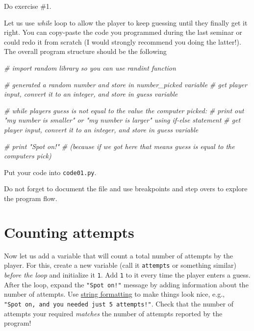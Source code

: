 \documentclass[
]{book}
\newenvironment{Shaded}{\begin{snugshade}}{\end{snugshade}}
\newcommand{\CommentTok}[1]{\textcolor[rgb]{0.56,0.35,0.01}{\textit{#1}}}
\begin{document}
Do exercise \#1.

Let us use \emph{while} loop to allow the player to keep guessing until they finally get it right. You can copy-paste the code you programmed during the last seminar or could redo it from scratch (I would strongly recommend you doing the latter!). The overall program structure should be the following

\begin{Shaded}
\begin{Highlighting}[]
\CommentTok{\# import random library so you can use randint function}

\CommentTok{\# generated a random number and store in number\_picked variable}
\CommentTok{\# get player input, convert it to an integer, and store in guess variable}

\CommentTok{\# while players guess is not equal to the value the computer picked:}
    \CommentTok{\# print out "my number is smaller" or "my number is larger" using if{-}else statement}
    \CommentTok{\# get player input, convert it to an integer, and store in guess variable}
    
\CommentTok{\# print "Spot on!" }
\CommentTok{\# (because if we got here that means guess is equal to the computer\textquotesingle{}s pick)}
\end{Highlighting}
\end{Shaded}

Put your code into \texttt{code01.py}.

Do not forget to document the file and use breakpoints and step overs to explore the program flow.

\hypertarget{counting-attempts}{%
\section{Counting attempts}\label{counting-attempts}}

Now let us add a variable that will count a total number of attempts by the player. For this, create a new variable (call it \texttt{attempts} or something similar) \emph{before the loop} and initialize it \texttt{1}. Add \texttt{1} to it every time the player enters a guess. After the loop, expand the \texttt{"Spot\ on!"} message by adding information about the number of attempts. Use \protect\hyperlink{ux5cux23string-formatting}{string formatting} to make things look nice, e.g., \texttt{"Spot\ on,\ and\ you\ needed\ just\ 5\ attempts!"}. Check that the number of attempts your required \emph{matches} the number of attempts reported by the program!
\end{document}
